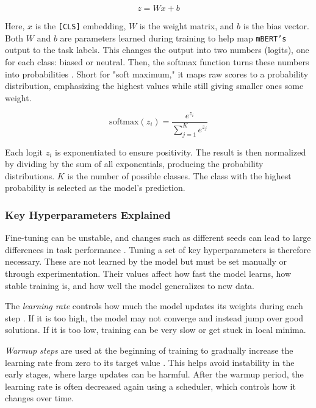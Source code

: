     \[
    z = Wx + b
    \]

    Here, \(x\) is the \texttt{[CLS]} embedding, \(W\) is the weight matrix, and \(b\) is the bias vector. Both \(W\) and \(b\) are parameters learned during training to help map \texttt{mBERT’s} output to the task labels. This changes the output into two numbers (logits), one for each class: biased or neutral. Then, the softmax function turns these numbers into probabilities \parencite{devlinBERTPretrainingDeep2019,xiaoIntroductionTransformersNLP2023}. Short for "soft maximum," it maps raw scores to a probability distribution, emphasizing the highest values while still giving smaller ones some weight.

    \[
    \text{softmax}(z_i) = \frac{e^{z_i}}{\sum_{j=1}^{K} e^{z_j}}
    \]

    Each logit \( z_i \) is exponentiated to ensure positivity. The result is then normalized by dividing by the sum of all exponentials, producing the probability distributions. \( K \) is the number of possible classes. The class with the highest probability is selected as the model’s prediction.
    
\subsubsection{Key Hyperparameters Explained} \label{subsection:hyperparameters_explained}
    Fine-tuning can be unstable, and changes such as different seeds can lead to large differences in task performance \parencite{mosbachStabilityFinetuningBERT2021}. Tuning a set of key hyperparameters is therefore necessary. These are not learned by the model but must be set manually or through experimentation. Their values affect how fast the model learns, how stable training is, and how well the model generalizes to new data.

    The \textit{learning rate} controls how much the model updates its weights during each step \parencite{mosbachStabilityFinetuningBERT2021}. If it is too high, the model may not converge and instead jump over good solutions. If it is too low, training can be very slow or get stuck in local minima.

    \textit{Warmup steps} are used at the beginning of training to gradually increase the learning rate from zero to its target value \parencite{mosbachStabilityFinetuningBERT2021}. This helps avoid instability in the early stages, where large updates can be harmful. After the warmup period, the learning rate is often decreased again using a scheduler, which controls how it changes over time.

